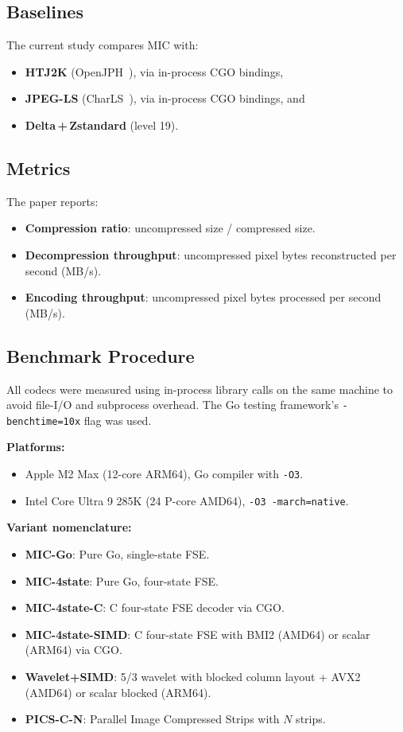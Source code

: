 \documentclass[journal]{IEEEtran}
\begin{document}
\subsection{Baselines}

The current study compares MIC with:
\begin{itemize}
  \item \textbf{HTJ2K} (OpenJPH~\cite{openjph}), via in-process CGO bindings,
  \item \textbf{JPEG-LS} (CharLS~\cite{charls}), via in-process CGO bindings,
  and
  \item \textbf{Delta\,+\,Zstandard} (level 19).
\end{itemize}

\subsection{Metrics}

The paper reports:
\begin{itemize}
  \item \textbf{Compression ratio}: uncompressed size / compressed size.
  \item \textbf{Decompression throughput}: uncompressed pixel bytes
  reconstructed per second (MB/s).
  \item \textbf{Encoding throughput}: uncompressed pixel bytes processed per
  second (MB/s).
\end{itemize}

\subsection{Benchmark Procedure}

All codecs were measured using in-process library calls on the same machine to
avoid file-I/O and subprocess overhead. The Go testing framework's
\texttt{-benchtime=10x} flag was used.

\textbf{Platforms:}
\begin{itemize}
  \item Apple M2 Max (12-core ARM64), Go compiler with \texttt{-O3}.
  \item Intel Core Ultra 9 285K (24 P-core AMD64),
  \texttt{-O3 -march=native}.
\end{itemize}

\textbf{Variant nomenclature:}
\begin{itemize}
  \item \textbf{MIC-Go}: Pure Go, single-state FSE.
  \item \textbf{MIC-4state}: Pure Go, four-state FSE.
  \item \textbf{MIC-4state-C}: C four-state FSE decoder via CGO.
  \item \textbf{MIC-4state-SIMD}: C four-state FSE with BMI2 (AMD64) or scalar
  (ARM64) via CGO.
  \item \textbf{Wavelet+SIMD}: 5/3 wavelet with blocked column layout + AVX2
  (AMD64) or scalar blocked (ARM64).
  \item \textbf{PICS-C-N}: Parallel Image Compressed Strips with $N$ strips.
\end{itemize}
\end{document}
